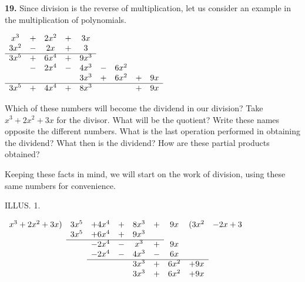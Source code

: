\documentclass{book}
\begin{document}
\textbf{ 19.} Since division is the reverse of multiplication, let
us consider an example in the multiplication of polynomials.

\begin{center}
\begin{math}
\begin{array}{ccccccccc}
x^3  & + & 2x^2 & + & 3x   &     &        &     & \\
3x^2 & - & 2x   & + & 3    &     &        &     & \\
\cline{1-5}
3x^5 & + & 6x^4 & + & 9x^3 &     &        &     & \\
       & - & 2x^4 & - & 4x^3 & - & 6x^2 &     & \\
       &     &        &     & 3x^3 & + & 6x^2 & + & 9x \\
\hline
3x^5 & + & 4x^4 & + & 8x^3 &     &        & + & 9x \\
\end{array}
\end{math}
\end{center}

Which of these numbers will become the dividend in
our division? Take $x^3 + 2x^2 + 3x$ for the divisor. What
will be the quotient? Write these names opposite the
different numbers. What is the last operation performed
in obtaining the dividend? What then is the dividend?
How are these partial products obtained?

Keeping these facts in mind, we will start on the
work of division, using these same numbers for convenience.

ILLUS. 1.\footnotemark
\begin{center}
\begin{math}
\begin{array}{rcccclccl}
x^{3} + 2 x^{2} + 3 x ) &  3 x^{5} & +  4 x^{4} & + & 8 x^{3} & + & 9 x&(3 x^{2} & - 2 x + 3 \\
                        &  3 x^{5} & +  6 x^{4} & + & 9 x^{3}\\
                          \cline{2-6}
                                  &  &- 2 x^{4} & - & x^{3} & + & 9 x\\
                                  & & -2 x^{4} & - & 4 x^{3} & - & 6 x \\
                                  \cline{3-8}
                                  &   &         &   & 3 x^{3} & + & 6 x^{2}& + 9 x\\
                                  &   &         &   & 3 x^{3} & + & 6 x^{2}& + 9 x\\
\end{array}
\end{math}
\end{center}
\end{document}
